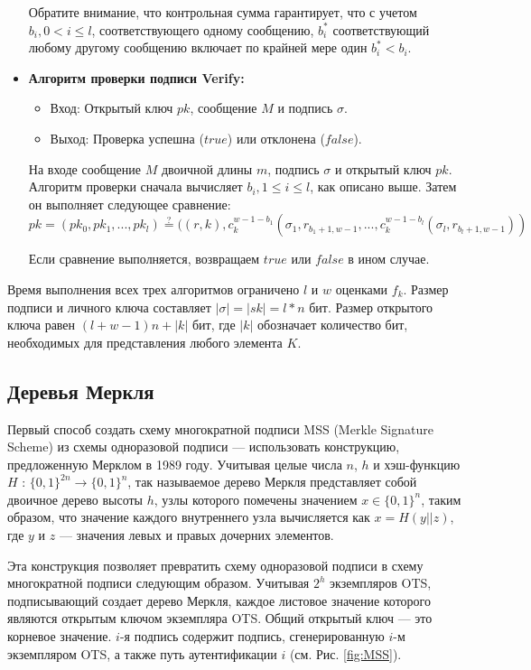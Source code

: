 \documentclass[a4paper, 14pt]{extarticle}
\begin{document}
\begin{itemize}
    Обратите внимание, что контрольная сумма гарантирует, что с учетом $b_{i}, 0 < i \leq l$, соответствующего одному сообщению, $b^{*}_{i}$ соответствующий любому другому сообщению включает по крайней мере один $b^{*}_{i} < b_{i}$.

    \item \textbf{Алгоритм проверки подписи Verify:}

    \begin{itemize}
        \item Вход: Открытый ключ $pk$, сообщение $M$ и подпись $\sigma$.
        \item Выход: Проверка успешна ($true$) или отклонена ($false$).
    \end{itemize}

    На входе сообщение $M$ двоичной длины $m$, подпись $\sigma$ и открытый ключ $pk$. Алгоритм проверки сначала вычисляет $b_{i}, 1 \leq i \leq l$, как описано выше. Затем он выполняет следующее сравнение:
    \[ pk = (pk_{0}, pk_{1}, ..., pk_{l}) \stackrel{?}{=} ((r,k),c^{w - 1 - b_{1}}_{k}(\sigma_{1}, r_{b_{1} + 1, w - 1}, ..., c^{w - 1 - b_{l}}_{k}(\sigma_{l}, r_{b_{l} + 1, w - 1}))\]

    Если сравнение выполняется, возвращаем $true$ или $false$ в ином случае.
\end{itemize}

Время выполнения всех трех алгоритмов ограничено $l$ и $w$ оценками $f_{k}$. Размер подписи и личного ключа составляет $|\sigma| = |sk| = l*n$ бит. Размер открытого ключа равен $(l + w - 1)n + |k|$ бит, где $|k|$ обозначает количество бит, необходимых для представления любого элемента $K$.

\subsection{Деревья Меркля}
Первый способ создать схему многократной подписи MSS (Merkle Signature Scheme) из схемы одноразовой подписи --- использовать конструкцию, предложенную Мерклом в 1989 году. Учитывая целые числа $n$, $h$ и хэш-функцию $H$ : $\{0, 1\}^{2n} \rightarrow \{0, 1\}^{n}$, так называемое дерево Меркля представляет собой двоичное дерево высоты $h$, узлы которого помечены значением $x \in \{0, 1\}^{n}$, таким образом, что значение каждого внутреннего узла вычисляется как $x = H(y||z)$, где $y$ и $z$ --- значения левых и правых дочерних элементов.

Эта конструкция позволяет превратить схему одноразовой подписи в схему многократной подписи следующим образом. Учитывая $2^h$ экземпляров OTS, подписывающий создает дерево Меркля, каждое листовое значение которого являются открытым ключом экземпляра OTS. Общий открытый ключ --- это корневое значение. $i$-я подпись содержит подпись, сгенерированную $i$-м экземпляром OTS, а также путь аутентификации $i$ (см. Рис. \ref{fig:MSS}).
\end{document}
